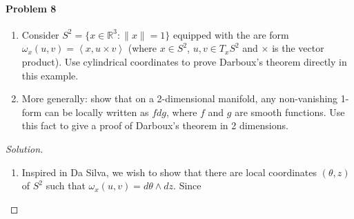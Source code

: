 \paragraph{Problem 8} \leavevmode 

\begin{enumerate}[label=\alph*.]
	\item Consider $S^{2}=\{x\in\mathbb{R}^{3}:\|x\|=1\}$ equipped with the are form $\omega_x(u,v)=\left<x,u\times v\right> $ (where $x\in S^{2}$, $u,v\in T_xS^{2}$ and $\times $ is the vector product). Use cylindrical coordinates to prove Darboux's theorem directly in this example.

	\item More generally: show that on a 2-dimensional manifold, any non-vanishing 1-form can be locally written as $fdg$, where $f$ and $g$ are smooth functions. Use this fact to give a proof of Darboux's theorem in 2 dimensions.
\end{enumerate}

\begin{proof}[Solution]\leavevmode
	\begin{enumerate}[label=\alph*.]
		\item Inspired in Da Silva, we wish to show that there are local coordinates $(\theta,z)$ of  $S^{2}$ such that $\omega_x(u,v)=d\theta\wedge dz$. Since 
	\end{enumerate}
\end{proof}


